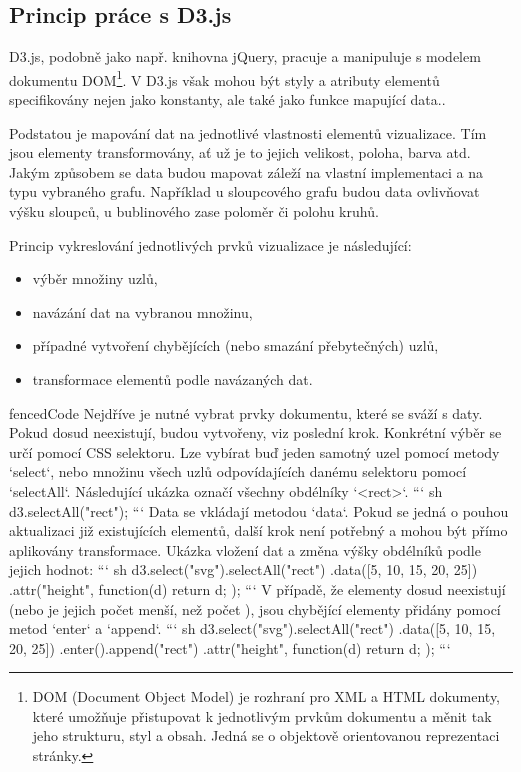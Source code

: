 \documentclass[
  digital, %
  oneside, %
  table,   %
  nolof,     %
  nolot,     %
]{fithesis3}
\begin{document}
\subsection{Princip práce s D3.js}
D3.js, podobně jako např. knihovna jQuery, pracuje a manipuluje s modelem dokumentu DOM\footnote{DOM (Document Object Model) je rozhraní pro XML a HTML dokumenty, které umožňuje přistupovat k jednotlivým prvkům dokumentu a měnit tak jeho strukturu, styl a obsah. Jedná se o objektově orientovanou reprezentaci stránky.}. V D3.js však mohou být styly a atributy elementů specifikovány nejen jako konstanty, ale také jako funkce mapující data.\cite{d3jsorg}.\par
Podstatou je mapování dat na jednotlivé vlastnosti elementů vizualizace. Tím jsou elementy transformovány, ať už je to jejich velikost, poloha, barva atd. Jakým způsobem se data budou mapovat záleží na vlastní implementaci a na typu vybraného grafu. Například u sloupcového grafu budou data ovlivňovat výšku sloupců, u bublinového zase poloměr či polohu kruhů. \cite{interactiveVisualizationBook}\par
Princip vykreslování jednotlivých prvků vizualizace je následující:
\begin{itemize}
  \item výběr množiny uzlů,
  \item navázání dat na vybranou množinu,
  \item případné vytvoření chybějících (nebo smazání přebytečných) uzlů,
  \item transformace elementů podle navázaných dat.
\end{itemize}
\begin{markdown*}{
  fencedCode
}
Nejdříve je nutné vybrat prvky dokumentu, které se sváží s daty. Pokud dosud neexistují, budou vytvořeny, viz poslední krok. Konkrétní výběr se určí pomocí CSS selektoru.
Lze vybírat buď jeden samotný uzel pomocí metody `select`, nebo množinu všech uzlů odpovídajících danému selektoru pomocí `selectAll`. Následující ukázka označí všechny obdélníky `<rect>`.
``` sh
	d3.selectAll("rect"); 
```
Data se vkládají metodou `data`. Pokud se jedná o pouhou aktualizaci již existujících elementů, další krok není potřebný a mohou být přímo aplikovány transformace. Ukázka vložení dat a změna výšky obdélníků podle jejich hodnot:
``` sh
	d3.select("svg").selectAll("rect")
	  .data([5, 10, 15, 20, 25])
	  .attr("height", function(d) { return d; });
```
V případě, že elementy dosud neexistují (nebo je jejich počet menší, než počet ), jsou chybějící elementy přidány pomocí metod `enter` a `append`.
``` sh
	d3.select("svg").selectAll("rect")
	  .data([5, 10, 15, 20, 25])
	  .enter().append("rect")
	  .attr("height", function(d) { return d; });
```
\end{markdown*}
\end{document}
